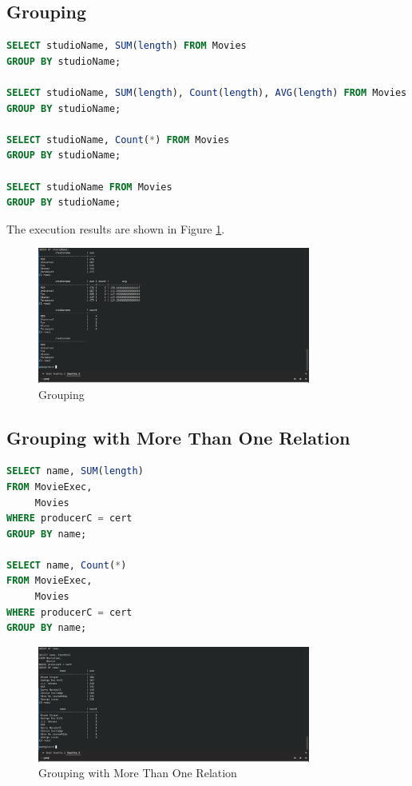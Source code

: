 \documentclass{cshwk}
\begin{document}
\subsection{Grouping}

\begin{lstlisting}[language=sql]
SELECT studioName, SUM(length) FROM Movies
GROUP BY studioName;

SELECT studioName, SUM(length), Count(length), AVG(length) FROM Movies
GROUP BY studioName;

SELECT studioName, Count(*) FROM Movies
GROUP BY studioName;

SELECT studioName FROM Movies
GROUP BY studioName;
\end{lstlisting}

The execution results are shown in Figure \ref{fig:grouping}.
\begin{figure}[H]
    \centering
    \includegraphics[width=0.8\textwidth]{hw6-3.png}
    \caption{Grouping}
    \label{fig:grouping}
\end{figure}

\subsection{Grouping with More Than One Relation}

\begin{lstlisting}[language=sql]
SELECT name, SUM(length)
FROM MovieExec,
     Movies
WHERE producerC = cert
GROUP BY name;

SELECT name, Count(*)
FROM MovieExec,
     Movies
WHERE producerC = cert
GROUP BY name;
\end{lstlisting}

\begin{figure}
    \centering
    \includegraphics[width=0.8\textwidth]{hw6-4.png}
    \caption{Grouping with More Than One Relation}
    \label{fig:grouping-more}
\end{figure}
\end{document}
